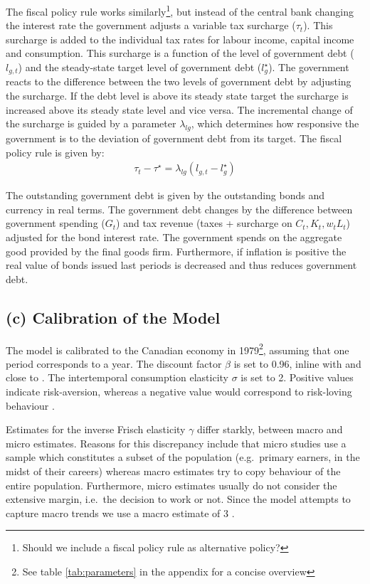 \documentclass[12pt]{article}
\begin{document}
The fiscal policy rule works similarly\footnote{Should we include a fiscal policy rule as alternative policy?}, but instead of the central bank changing the interest rate the government adjusts a variable tax surcharge ($\tau_t$). This surcharge is added to the individual tax rates for labour income, capital income and consumption. This surcharge is a function of the level of government debt ($l_{g,t}$) and the steady-state target level of government debt ($l^{\star}_{g}$). The government reacts to the difference between the two levels of government debt by adjusting the surcharge. If the debt level is above its steady state target the surcharge is increased above its steady state level and vice versa. The incremental change of the surcharge is guided by a parameter $\lambda_{l g}$, which determines how responsive the government is to the deviation of government debt from its target. The fiscal policy rule is given by:
\begin{align}
    \tau_t - \tau^{\star} = \lambda_{l g} (l_{g,t} - l^{\star}_{g})
\end{align}

The outstanding government debt is given by the outstanding bonds and currency in real terms. The government debt changes by the difference between government spending ($G_t$) and tax revenue (taxes + surcharge on $C_t, K_t, w_tL_t$) adjusted for the bond interest rate. The government spends on the aggregate good provided by the final goods firm. Furthermore, if inflation is positive the real value of bonds issued last periods is decreased and thus reduces government debt.


\subsection*{(c) Calibration of the Model}
The model is calibrated to the Canadian economy in 1979\footnote{See table \ref{tab:parameters} in the appendix for a concise overview}, assuming that one period corresponds to a year. 
The discount factor $\beta$ is set to 0.96, inline with \textcite{someOilDemandSupply2023} and close to \textcite{corriganToTEMIIIBank2021}. 
The intertemporal consumption elasticity $\sigma$ is set to 2. Positive values indicate risk-aversion, whereas a negative value would correspond to risk-loving behaviour
\parencite{thimmeIntertemporalSubstitutionConsumption2017}.

Estimates for the inverse Frisch elasticity $\gamma$ differ starkly, between macro and micro estimates. Reasons for this discrepancy
include that micro studies use a sample which constitutes a subset of the population (e.g.\ primary earners, in the midst of their careers) whereas macro 
estimates try to copy behaviour of the entire population. Furthermore, micro estimates usually do not consider the extensive margin, i.e.\ the decision 
to work or not. Since the model attempts to capture macro trends we use a macro estimate of 3 \parencite{petermanReconcilingMicroMacro2016}. 
\end{document}
